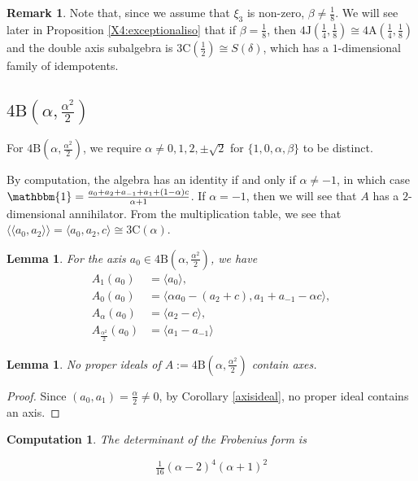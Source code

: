 \documentclass[11pt, a4paper]{article}
\theoremstyle{plain}
\newtheorem{lemma}[theorem]{Lemma}
\newtheorem{computation}[theorem]{Computation}
\theoremstyle{definition}
\newtheorem{remark}[theorem]{Remark}
\newcommand\al{\alpha}
\newcommand\bt{\beta}
\newcommand\dl{\delta}
\newcommand\la{\langle}
\newcommand\ra{\rangle}
\newcommand\lla{\langle\!\langle}
\newcommand\rra{\rangle\!\rangle}
\newcommand{\A}{\mathrm{A}}
\newcommand{\B}{\mathrm{B}}
\newcommand{\C}{\mathrm{C}}
\newcommand{\J}{\mathrm{J}}
\newcommand{\0}{\overline{0}}
\newcommand{\2}{\overline{2}}
\newcommand{\1}{\mathbbm{1}}
\newcommand{\rt}{\xi}
\begin{document}
\begin{remark}
Note that, since we assume that $\rt_3$ is non-zero, $\bt \neq \frac{1}{8}$.  We will see later in Proposition \ref{X4:exceptionaliso} that if $\bt = \frac{1}{8}$, then $4\J(\frac{1}{4}, \frac{1}{8}) \cong 4\A(\frac{1}{4}, \frac{1}{8})$ and the double axis subalgebra is $3\C(\frac{1}{2}) \cong S(\dl)$, which has a $1$-dimensional family of idempotents.
\end{remark}




\subsection{$4\B(\al, \frac{\al^2}{2})$}

For $4\B(\al, \frac{\al^2}{2})$, we require $\al  \neq 0,1, 2, \pm \sqrt{2}$ for $\{1,0,\al,\bt\}$ to be distinct.

By computation, the algebra has an identity if and only if $\al \neq -1$, in which case $ \1 = \tfrac{a_0 +a_2 +a_{-1}+ a_1 + (1-\al)c}{\al + 1}$.  If $\al = -1$, then we will see that $A$ has a $2$-dimensional annihilator.  From the multiplication table, we see that $\lla a_0, a_2 \rra = \la a_0,a_2,c \ra \cong 3\C(\al)$.

\begin{lemma}\label{4Beigenspaces}
	For the axis $ a_0 \in 4\B(\al, \tfrac{\al^2}{2})$, we have
	\begin{align*}
		A_1(a_0) &= \la a_0 \ra, \\	
		A_0(a_0) &= \la \al a_0 - (a_2 + c), a_1 + a_{-1} -\al c \ra, \\
		A_{\al}(a_0) &= \la a_2 - c \ra, \\
		A_{\tfrac{\al^2}{2}}(a_0) &= \la a_1 - a_{-1} \ra 
	\end{align*}
\end{lemma}

\begin{lemma}
No proper ideals of $A := 4\B(\al, \frac{\al^2}{2})$ contain axes.
\end{lemma}
\begin{proof} Since $(a_0, a_1) = \frac{\al}{2} \neq 0$, by Corollary \ref{axisideal}, no proper ideal contains an axis.
\end{proof}


\begin{computation}
	The determinant of the Frobenius form is
	
	\[
	\tfrac{1}{16}  (\al - 2)^4 (\al + 1)^2
	\]
\end{computation}
\end{document}
